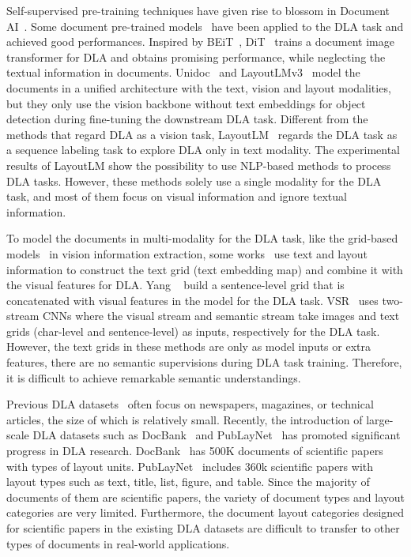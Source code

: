 \documentclass[10pt,twocolumn,letterpaper]{article}
\begin{document}
Self-supervised pre-training techniques have given rise to blossom in Document AI~\cite{xu2020layoutlm,xu2020layoutlmv2,li2021structext,appalaraju2021docformer,luo2022bivldoc,huang2022layoutlmv3,li2022dit,gu2021unidoc,Luo_2023_CVPR}. 
Some document pre-trained models~\cite{huang2022layoutlmv3,li2022dit,gu2021unidoc} have been applied to the DLA task and achieved good performances.
Inspired by BEiT~\cite{bao2021beit}, DiT~\cite{li2022dit} trains a document image transformer for DLA and obtains promising performance, while neglecting the textual information in documents.
Unidoc~\cite{gu2021unidoc} and LayoutLMv3~\cite{huang2022layoutlmv3} model the documents in a unified architecture with the text, vision and layout modalities, but they only use the vision backbone without text embeddings for object detection during fine-tuning the downstream DLA task.
Different from the methods that regard DLA as a vision task, LayoutLM~\cite{xu2020layoutlm} regards the DLA task as a sequence labeling task to explore DLA only in text modality.
The experimental results of LayoutLM show the possibility to use NLP-based methods to process DLA tasks.
However, these methods solely use a single modality for the DLA task, and most of them focus on visual information and  ignore textual information.

To model the documents in multi-modality for the DLA task, like the grid-based models~\cite{katti2018chargrid,denk2019bertgrid,lin2021vibertgrid} in vision information extraction, some works~\cite{yang2017learning,zhang2021vsr} use text and layout information to construct the text grid (text embedding map) and combine it with the visual features for DLA.
Yang \etal~\cite{yang2017learning} build a sentence-level grid that is concatenated with visual features in the model for the DLA task.
VSR~\cite{zhang2021vsr} uses two-stream CNNs where the visual stream and semantic stream take images and text grids (char-level and sentence-level) as inputs, respectively for the DLA task.
However, the text grids in these methods are only as model inputs or extra features, there are no semantic supervisions during DLA task training. Therefore, it is difficult to achieve remarkable semantic understandings.

Previous DLA datasets~\cite{AntonacopoulosBPP09,ClausnerPPA15,yang2017learning} often focus on newspapers, magazines, or technical articles, the size of which is relatively small. 
Recently, the introduction of large-scale DLA datasets such as DocBank~\cite{li2020docbank} and PubLayNet~\cite{zhong2019publaynet} has promoted significant progress in DLA research.
DocBank~\cite{li2020docbank} has 500K documents of scientific papers with  types of layout units.
PubLayNet~\cite{zhong2019publaynet} includes 360k scientific papers with  layout types such as text, title, list, figure, and table.
Since the majority of documents of them are scientific papers,
the variety of document types and layout categories are very limited.
Furthermore, the document layout categories designed for scientific papers in the existing DLA datasets are difficult to transfer to other types of documents in real-world applications.
\end{document}
